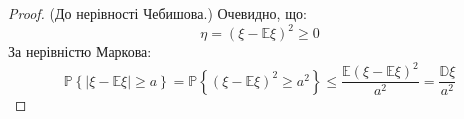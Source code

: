 \begin{proof}(До нерівності Чебишова.) Очевидно, що:
$$
\eta = \left( \xi - \mathbb{E} \xi \right)^2 \geq 0
$$
 За нерівністю Маркова:
 $$
  \mathbb{P} \left\lbrace \left| \xi - \mathbb{E} \xi \right| \geq a  \right\rbrace=\mathbb{P} \left\lbrace  (\xi - \mathbb{E} \xi)^2 \geq a^2 \right\rbrace \leq \frac{\mathbb{E} \left( \xi - \mathbb{E} \xi \right)^2}{a^2} = \frac{\mathbb{D}\xi}{a^2}
 $$
\end{proof}

